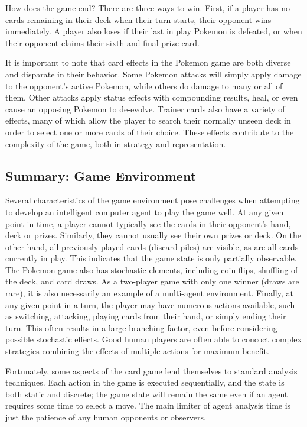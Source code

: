 \documentclass{article}
\begin{document}
How does the game end? There are three ways to win.  First, if a player has no cards remaining in their deck when their turn starts, their opponent wins immediately.  A player also loses if their last in play Pokemon is defeated, or when their opponent claims their sixth and final prize card.

It is important to note that card effects in the Pokemon game are both diverse and disparate in their behavior.  Some Pokemon attacks will simply apply damage to the opponent's active Pokemon, while others do damage to many or all of them.  Other attacks apply status effects with compounding results, heal, or even cause an opposing Pokemon to de-evolve.  Trainer cards also have a variety of effects, many of which allow the player to search their normally unseen deck in order to select one or more cards of their choice.  These effects contribute to the complexity of the game, both in strategy and representation.

\subsection{Summary: Game Environment} %

Several characteristics of the game environment pose challenges when attempting to develop an intelligent computer agent to play the game well.  At any given point in time, a player cannot typically see the cards in their opponent's hand, deck or prizes.  Similarly, they cannot usually see their own prizes or deck.  On the other hand, all previously played cards (discard piles) are visible, as are all cards currently in play.  This indicates that the game state is only partially observable.  The Pokemon game also has stochastic elements, including coin flips, shuffling of the deck, and card draws.  As a two-player game with only one winner (draws are rare), it is also necessarily an example of a multi-agent environment.  Finally, at any given point in a turn, the player may have numerous actions available, such as switching, attacking, playing cards from their hand, or simply ending their turn.  This often results in a large branching factor, even before considering possible stochastic effects.  Good human players are often able to concoct complex strategies combining the effects of multiple actions for maximum benefit.

Fortunately, some aspects of the card game lend themselves to standard analysis techniques.  Each action in the game is executed sequentially, and the state is both static and discrete; the game state will remain the same even if an agent requires some time to select a move.  The main limiter of agent analysis time is just the patience of any human opponents or observers.
\end{document}
